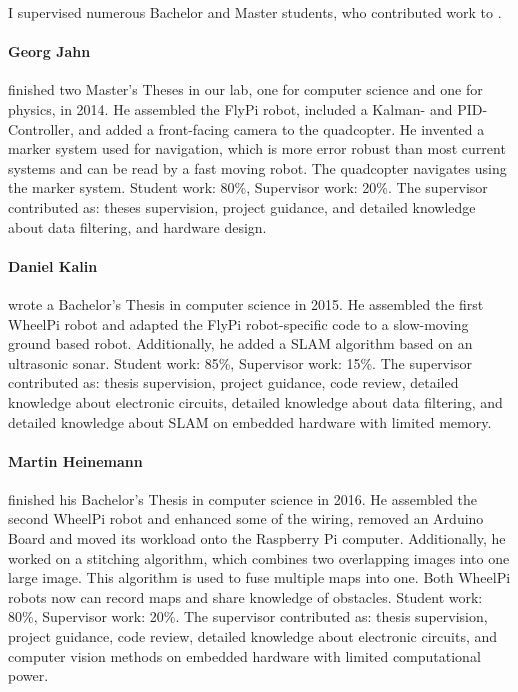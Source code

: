 I supervised numerous Bachelor and Master students, who contributed work to .

\paragraph{Georg Jahn} finished two Master's Theses in our lab, one for computer science and one for physics, in 2014.
He assembled the FlyPi robot, included a Kalman- and PID-Controller, and added a front-facing camera to the quadcopter.
He invented a marker system used for navigation, which is more error robust than most current systems and can be read by a fast moving robot.
The quadcopter navigates using the marker system.
Student work: 80\%, Supervisor work: 20\%.
The supervisor contributed as: theses supervision, project guidance, and detailed knowledge about data filtering, and hardware design.

\paragraph{Daniel Kalin} wrote a Bachelor's Thesis in computer science in 2015.
He assembled the first WheelPi robot and adapted the FlyPi robot-specific code to a slow-moving ground based robot.
Additionally, he added a SLAM algorithm based on an ultrasonic sonar.
Student work: 85\%, Supervisor work: 15\%.
The supervisor contributed as: thesis supervision, project guidance, code review, detailed knowledge about electronic circuits, detailed knowledge about data filtering, and detailed knowledge about SLAM on embedded hardware with limited memory.

\paragraph{Martin Heinemann} finished his Bachelor's Thesis in computer science in 2016.
He assembled the second WheelPi robot and enhanced some of the wiring, \eg removed an Arduino Board and moved its workload onto the Raspberry Pi computer.
Additionally, he worked on a stitching algorithm, which combines two overlapping images into one large image.
This algorithm is used to fuse multiple maps into one.
Both WheelPi robots now can record maps and share knowledge of obstacles.
Student work: 80\%, Supervisor work: 20\%.
The supervisor contributed as: thesis supervision, project guidance, code review, detailed knowledge about electronic circuits, and computer vision methods on embedded hardware with limited computational power.

